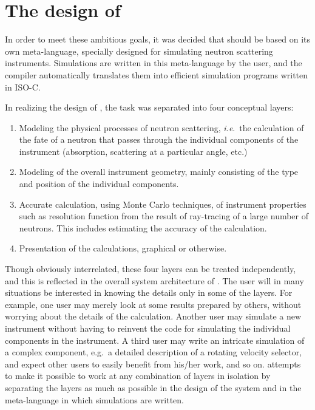 \section{The design of \MCS}
\label{s:design}

In order to meet these ambitious goals, it was decided that \MCS should
be based on its own meta-language, specially designed for
simulating neutron scattering instruments. Simulations are written in
this meta-language by the user, and the \MCS compiler automatically
translates them into efficient simulation programs written in ISO-C.

In realizing the design of \MCS, the task was
separated into four conceptual layers:
\begin{enumerate}
\item Modeling the physical processes of neutron scattering, \textit{i.e}.\ 
  the calculation of the fate of a neutron that passes through the
  individual components of the instrument (absorption, scattering at a
  particular angle, etc.)
\item Modeling of the overall instrument geometry, mainly consisting
  of the type and position of the individual components.
\item Accurate calculation, using Monte Carlo techniques, of
  instrument properties such as resolution function from the result of
  ray-tracing of a large number of neutrons. This includes estimating
  the accuracy of the calculation.
\item Presentation of the calculations, graphical or otherwise.
\end{enumerate}

Though obviously interrelated, these four layers can be
treated independently, and this is reflected in the overall system
architecture of \MCS. The user will in many situations be
interested in knowing the details only in some of the layers. For
example, one user may merely look at some results prepared by others,
without worrying about the details of the calculation. Another user
may simulate a new instrument without having to reinvent the
code for simulating the individual components in the instrument. A third
user may write an intricate simulation of a complex component,
e.g.\ a detailed description of a rotating velocity selector, 
and expect other users to easily
benefit from his/her work, and so on. \MCS attempts to make it
possible to work at any combination of layers in isolation by separating
the layers as much as possible in the design of the system and in
the meta-language in which simulations are written.


